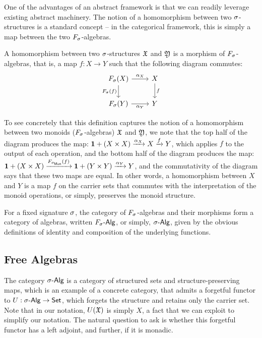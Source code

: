 One of the advantages of an abstract framework is that we can readily leverage existing abstract machinery.
%
The notion of a homomorphism between two $\sigma$-structures is a standard concept --
in the categorical framework, this is simply a map between the two $\Sig$-algebras.

\begin{definition}[Homomorphism]
    A homomorphism between two $\sigma$-structures $\mathfrak{X}$ and $\mathfrak{Y}$ is a morphism of $\Sig$-algebras,
    that is, a map $f : X \to Y$ such that the following diagram commutes:
    \[
        \begin{tikzcd}
            \Sig(X) \arrow[r, "\alpha_{X}"] \arrow[d, "\Sig(f)"']
            & X \arrow[d, "f"] \\
            \Sig(Y) \arrow[r, "\alpha_{Y}"']
            & Y
        \end{tikzcd}
    \]
\end{definition}

\begin{example}
    To see concretely that this definition captures the notion of a homomorphism between two monoids ($\Sig$-algebras)
    $\mathfrak{X}$ and $\mathfrak{Y}$, we note that the top half of the diagram produces the map:
    ${\mathbf{1}} + (X \times X) \xrightarrow{\alpha_{X}} X \xrightarrow{f} Y$, which applies $f$ to the output of each operation,
    and the bottom half of the diagram produces the map:
    $\unitt + (X \times X) \xto{\SigMon(f)} \unitt + (Y \times Y) \xto{\alpha_{Y}} Y$,
    and the commutativity of the diagram says that these two maps are equal.
    In other words, a homomorphism between $X$ and $Y$ is a map $f$ on the carrier sets that commutes with the
    interpretation of the monoid operations, or simply, preserves the monoid structure.
\end{example}

For a fixed signature $\sigma$,
the category of $\Sig$-algebras and their morphisms form a category of algebras,
written $\SigAlg$, or simply, $\sigAlg$,
given by the obvious definitions of identity and composition of the underlying functions.

\subsection{Free Algebras}
\label{sec:universal-algebra:free-algebras}

The category $\sigAlg$ is a category of structured sets and structure-preserving maps,
which is an example of a concrete category, that admits a forgetful functor to $U : \sigAlg \to \Set$,
which forgets the structure and retains only the carrier set.
%
Note that in our notation, $U(\mathfrak{X})$ is simply $X$, a fact that we can exploit to simplify our notation.
%
The natural question to ask is whether this forgetful functor has a left adjoint, and further, if it is monadic.


